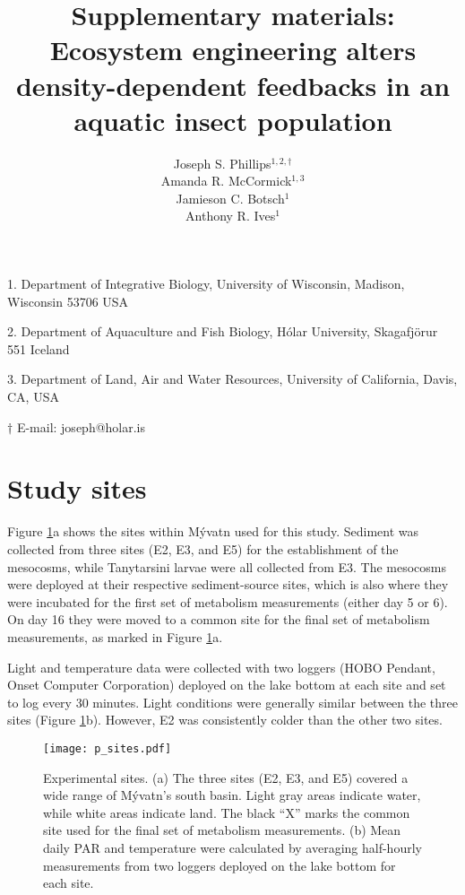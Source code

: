 \documentclass[12pt]{article}
\title{\textbf{Supplementary materials:} \\ 
        Ecosystem engineering alters density-dependent feedbacks in an aquatic insect population}
\author{
  Joseph S. Phillips$^{1,2,\dagger}$ \\
  Amanda R. McCormick$^{1,3}$ \\
  Jamieson C. Botsch$^{1}$ \\
  Anthony R. Ives$^{1}$}
\date{}
\begin{document}
\raggedright
\setlength\parindent{0.25in}

\maketitle

\noindent{} 1. Department of Integrative Biology, University of Wisconsin, Madison, Wisconsin 53706 USA

\noindent{} 2. Department of Aquaculture and Fish Biology, H\'{o}lar University, Skagafj\"{o}r{\dh}ur 551 Iceland

\noindent{} 3. Department of Land, Air and Water Resources, 
University of California, Davis, CA, USA

\noindent{} $\dagger$ E-mail: joseph@holar.is

\linenumbers{}

\clearpage


\section*{Study sites}

Figure \ref{fig:sites}a shows the sites within M\'{y}vatn used for this study. 
Sediment was collected from three sites (E2, E3, and E5) for the establishment of the mesocosms,
while Tanytarsini larvae were all collected from E3. 
The mesocosms were deployed at their respective sediment-source sites, 
which is also where they were incubated for the first set of metabolism measurements
(either day 5 or 6). 
On day 16 they were moved to a common site for the final set of metabolism measurements,
as marked in Figure \ref{fig:sites}a.

Light and temperature data were collected with two loggers 
(HOBO Pendant, Onset Computer Corporation) deployed on the lake bottom at each site
and set to log every 30 minutes.
Light conditions were generally similar between the three sites (Figure \ref{fig:sites}b).
However, E2 was consistently colder than the other two sites.

\begin{figure}
\centering
\texttt{[image: p\_sites.pdf]}
\caption{\label{fig:sites}
Experimental sites. 
(a) The three sites (E2, E3, and E5) covered a wide range of M\'{y}vatn's south basin.
Light gray areas indicate water, while white areas indicate land.
The black ``X'' marks the common site used for the final set of metabolism measurements.
(b) Mean daily PAR and temperature were calculated by averaging half-hourly
measurements from two loggers deployed on the lake bottom for each site.
}
\end{figure}
\end{document}
